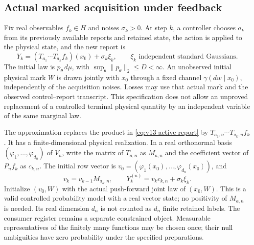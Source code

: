 \subsection{Actual marked acquisition under feedback}
Fix real observables $f_k\in H$ and noises $\sigma_k>0$. At step $k$,
a controller chooses $a_k$ from its previously available reports and
retained state, the action is applied to the physical state, and the
new report is
\begin{equation}\label{eq:v13-active-report}
 Y_k=(T_{a_1}\cdots T_{a_k}f_k)(x_0)+\sigma_k\xi_k,
 \qquad \xi_k\text{ independent standard Gaussians}.
\end{equation}
The initial law is $p_\theta\,d\mu$, with
$\sup_\theta\|p_\theta\|_2\le D<\infty$.
An unobserved initial physical mark $W$ is drawn jointly with $x_0$
through a fixed channel $\gamma(dw\mid x_0)$, independently of the
acquisition noises. Losses may use that actual mark and the observed
control--report transcript. This specification does not allow an
unproved replacement of a controlled terminal physical quantity by
an independent variable of the same marginal law.

The approximation replaces the product in
\eqref{eq:v13-active-report} by $T_{a_1,n}\cdots T_{a_k,n}f_k$.
It has a finite-dimensional physical realization. In a real orthonormal
basis $(\varphi_1,\ldots,\varphi_{d_n})$ of $V_n$, write the matrix of
$T_{a,n}$ as $M_{a,n}$ and the coefficient vector of $P_nf_k$ as
$c_{k,n}$. The initial row vector is
$v_0=(\varphi_1(x_0),\ldots,\varphi_{d_n}(x_0))$, and
\[
 v_k=v_{k-1}M_{a_k,n},\qquad Y_k^{(n)}=v_kc_{k,n}+\sigma_k\xi_k.
\]
Initialize $(v_0,W)$ with the actual push-forward joint law of $(x_0,W)$.
This is a valid controlled probability model with a real vector state;
no positivity of $M_{a,n}$ is needed. Its real dimension $d_n$ is not
counted as $d_n$ finite retained labels. The consumer register remains
a separate constrained object. Measurable representatives of the
finitely many functions may be chosen once; their null ambiguities
have zero probability under the specified preparations.

